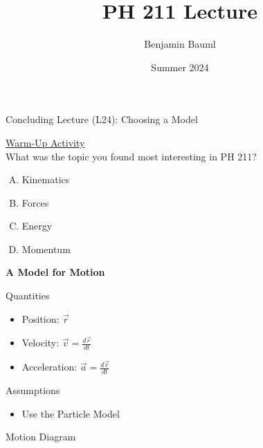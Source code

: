 \documentclass[]{article}
\title{PH 211 Lecture \Week}
\author{Benjamin Bauml}
\date{Summer 2024}
\newcommand{\Week}{24}
\begin{document}
\begin{TeacherMargin}

\end{TeacherMargin}
\begin{PresentSpace}
\begin{center}
	\huge Concluding Lecture (L\Week): Choosing a Model
\end{center}
\vspace{0.5cm}
\underline{Warm-Up Activity} \\
What was the topic you found most interesting in PH 211?
\begin{enumerate}[(A)]
	\item Kinematics
	\item Forces
	\item Energy
	\item Momentum
\end{enumerate}
\end{PresentSpace}
\newpage
\begin{TeacherMargin}

\end{TeacherMargin}
\begin{PresentSpace}
\textbf{A Model for Motion}
\begin{multicols}{2}
	Quantities
	\begin{itemize}
		\item Position: $\vec{r}$
		\item Velocity: $\vec{v}=\frac{d\vec{r}}{dt}$
		\item Acceleration: $\vec{a}=\frac{d\vec{v}}{dt}$
	\end{itemize}
	\vspace{1cm}
	Assumptions
	\begin{itemize}
		\item Use the Particle Model
	\end{itemize}
\end{multicols}
Motion Diagram
\begin{figure}[h]
	\centering
\end{figure}
\end{PresentSpace}
\end{document}
